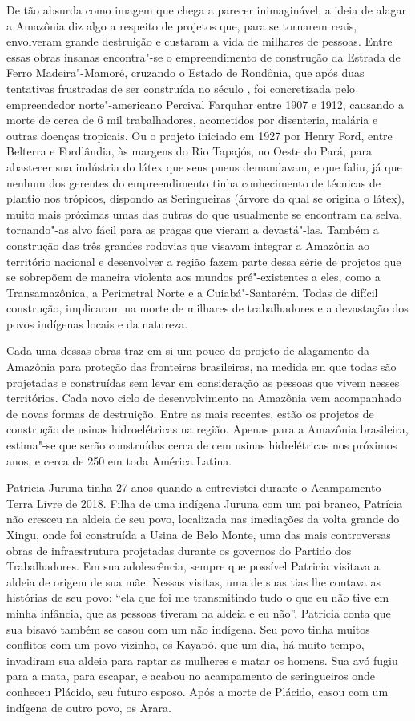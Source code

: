 De tão absurda como imagem que chega a parecer inimaginável, a ideia de
alagar a Amazônia diz algo a respeito de projetos que, para se tornarem
reais, envolveram grande destruição e custaram a vida de milhares de
pessoas. Entre essas obras insanas encontra"-se o empreendimento de
construção da Estrada de Ferro Madeira"-Mamoré, cruzando o Estado de
Rondônia, que após duas tentativas frustradas de ser construída no
século , foi concretizada pelo empreendedor norte"-americano Percival
Farquhar entre 1907 e 1912, causando a morte de cerca de 6 mil
trabalhadores, acometidos por disenteria, malária e outras doenças
tropicais. Ou o projeto iniciado em 1927 por Henry Ford, entre Belterra
e Fordlândia, às margens do Rio Tapajós, no Oeste do Pará, para
abastecer sua indústria do látex que seus pneus demandavam, e que faliu,
já que nenhum dos gerentes do empreendimento tinha conhecimento de
técnicas de plantio nos trópicos, dispondo as Seringueiras (árvore da
qual se origina o látex), muito mais próximas umas das outras do que
usualmente se encontram na selva, tornando"-as alvo fácil para as pragas
que vieram a devastá"-las. Também a construção das três grandes rodovias
que visavam integrar a Amazônia ao território nacional e desenvolver a
região fazem parte dessa série de projetos que se sobrepõem de maneira
violenta aos mundos pré"-existentes a eles, como a Transamazônica, a
Perimetral Norte e a Cuiabá"-Santarém. Todas de difícil construção,
implicaram na morte de milhares de trabalhadores e a devastação dos
povos indígenas locais e da natureza.

Cada uma dessas obras traz em si um pouco do projeto de alagamento da
Amazônia para proteção das fronteiras brasileiras, na medida em que
todas são projetadas e construídas sem levar em consideração as pessoas
que vivem nesses territórios. Cada novo ciclo de desenvolvimento na
Amazônia vem acompanhado de novas formas de destruição. Entre as mais
recentes, estão os projetos de construção de usinas hidroelétricas na
região. Apenas para a Amazônia brasileira, estima"-se que serão
construídas cerca de cem usinas hidrelétricas nos próximos anos, e cerca
de 250 em toda América Latina.

Patricia Juruna tinha 27 anos quando a entrevistei durante o Acampamento
Terra Livre de 2018. Filha de uma indígena Juruna com um pai branco,
Patrícia não cresceu na aldeia de seu povo, localizada nas imediações da
volta grande do Xingu, onde foi construída a Usina de Belo Monte, uma
das mais controversas obras de infraestrutura projetadas durante os
governos do Partido dos Trabalhadores. Em sua adolescência, sempre que
possível Patricia visitava a aldeia de origem de sua mãe. Nessas
visitas, uma de suas tias lhe contava as histórias de seu povo: ``ela
que foi me transmitindo tudo o que eu não tive em minha infância, que as
pessoas tiveram na aldeia e eu não''. Patricia conta que sua bisavó
também se casou com um não indígena. Seu povo tinha muitos conflitos com
um povo vizinho, os Kayapó, que um dia, há muito tempo, invadiram sua
aldeia para raptar as mulheres e matar os homens. Sua avó fugiu para a
mata, para escapar, e acabou no acampamento de seringueiros onde
conheceu Plácido, seu futuro esposo. Após a morte de Plácido, casou com
um indígena de outro povo, os Arara.

